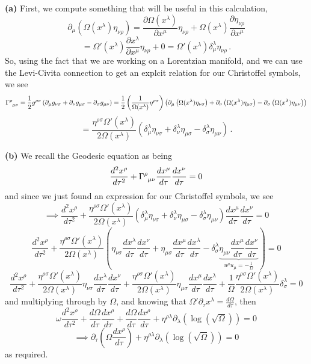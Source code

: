 \documentclass[10pt]{article}
\newcommand{\del}[2][]{\frac{d #1}{d #2}}
\begin{document}
\textbf{(a)} First, we compute something that will be useful in this calculation,
\[ \partial_{\mu}\left(\Omega(x^{\lambda})\eta_{\nu\rho}\right) = \frac{\partial \Omega(x^{\lambda})}{\partial x^{\mu}}\eta_{\nu\rho} + \Omega(x^{\lambda})\frac{\partial \eta_{\nu\rho}}{\partial x^{\mu}}\]
\[ = \Omega'(x^{\lambda})\frac{\partial x^{\lambda}}{\partial x^{\mu}}\eta_{\nu\rho} + 0 = \Omega'(x^{\lambda})\delta^{\lambda}_{\mu}\eta_{\nu\rho}\, . \]
So, using the fact that we are working on a Lorentzian manifold, and we can use the Levi-Civita connection to get an explcit relation for our Christoffel symbols, we see
\[ \tensor{\Gamma}{^{\rho}_{\mu\nu}} = \frac{1}{2}g^{\rho\sigma}\left(\partial_{\mu}g_{\nu\sigma} + \partial_{\nu}g_{\mu\sigma} - \partial_{\sigma}g_{\mu\nu}\right) = \frac{1}{2}\left(\frac{1}{\Omega(x^{\lambda})}\eta^{\rho\sigma}\right)\left( \partial_{\mu}\left(\Omega(x^{\lambda})\eta_{\nu\sigma}\right) + \partial_{\nu}\left(\Omega(x^{\lambda})\eta_{\mu\sigma}\right) - \partial_{\sigma}\left(\Omega(x^{\lambda})\eta_{\mu\nu}\right)\right)\]
\[ = \frac{\eta^{\rho\sigma}\Omega'(x^{\lambda})}{2\Omega(x^{\lambda})}\left(\delta_{\mu}^{\lambda}\eta_{\nu\sigma} + \delta^{\lambda}_{\nu}\eta_{\mu\sigma} - \delta_{\sigma}^{\lambda}\eta_{\mu\nu}\right) \, .\]

\textbf{(b)} We recall the Geodesic equation as being
\[ \frac{d^{2} x^{\rho}}{d \tau^{2}} + \tensor{\Gamma}{^{\rho}_{\mu\nu}}\del[x^{\mu}]{\tau}\del[x^{\nu}]{\tau} = 0\]
and since we just found an expression for our Christoffel symbols, we see
\[ \implies \frac{d^{2} x^{\rho}}{d \tau^{2}} + \frac{\eta^{\rho\sigma}\Omega'(x^{\lambda})}{2\Omega(x^{\lambda})}\left(\delta_{\mu}^{\lambda}\eta_{\nu\sigma} + \delta^{\lambda}_{\nu}\eta_{\mu\sigma} - \delta_{\sigma}^{\lambda}\eta_{\mu\nu}\right)\del[x^{\mu}]{\tau}\del[x^{\nu}]{\tau} = 0\]
\[ \frac{d^{2} x^{\rho}}{d \tau^{2}} + \frac{\eta^{\rho\sigma}\Omega'(x^{\lambda})}{2\Omega(x^{\lambda})}\left(\eta_{\nu\sigma}\del[x^{\lambda}]{\tau}\del[x^{\nu}]{\tau} + \eta_{\mu\sigma}\del[x^{\mu}]{\tau}\del[x^{\lambda}]{\tau} - \delta_{\sigma}^{\lambda}\underbrace{\eta_{\mu\nu}\del[x^{\mu}]{\tau}\del[x^{\nu}]{\tau}}_{u^{\mu}u_{\mu} = -\frac{1}{\Omega}}\right) = 0\]
\[ \frac{d^{2} x^{\rho}}{d \tau^{2}} + \frac{\eta^{\rho\sigma}\Omega'(x^{\lambda})}{2\Omega(x^{\lambda})}\eta_{\nu\sigma}\del[x^{\lambda}]{\tau}\del[x^{\nu}]{\tau} + \frac{\eta^{\rho\sigma}\Omega'(x^{\lambda})}{2\Omega(x^{\lambda})}\eta_{\mu\sigma}\del[x^{\mu}]{\tau}\del[x^{\lambda}]{\tau} + \frac{1}{\Omega}\frac{\eta^{\rho\sigma}\Omega'(x^{\lambda})}{2\Omega(x^{\lambda})}\delta_{\sigma}^{\lambda} = 0 \]
and multiplying through by $\Omega$, and knowing that $\Omega'\partial_{\tau}x^{\lambda} = \frac{d\Omega}{d\tau}$, then
\[ \omega \frac{d^{2} x^{\rho}}{d \tau^{2}} + \frac{d\Omega}{d\tau}\del[x^{\rho}]{\tau} + \frac{d\Omega}{d\tau}\del[x^{\rho}]{\tau} + \eta^{\rho\lambda}\partial_{\lambda}\left(\log(\sqrt{\Omega})\right) = 0\]
\[ \implies \partial_{\tau}\left(\Omega \del[x^{\rho}]{\tau}\right) + \eta^{\rho\lambda}\partial_{\lambda}\left(\log(\sqrt{\Omega})\right) = 0 \]
as required.
\end{document}
